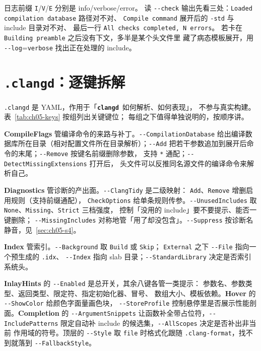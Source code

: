 \documentclass[12pt,a4paper,fontset=fandol]{ctexbook}
\newcommand{\Opt}[1]{\texttt{-\/-#1}}
\newcommand{\Bk}{\discretionary{}{}{}}
\newcommand{\Lib}[1]{\textbf{\texttt{#1}}}
\newcommand{\CD}{\Lib{clangd}}
\begin{document}
日志前缀 \texttt{I}/{\Bk}\texttt{V}/{\Bk}\texttt{E} 分别是 info/verbose/error。
读 \Opt{check} 输出先看三处：\texttt{Loaded compilation database} 路径对不对、
\texttt{Compile command} 展开后的 \texttt{-std} 与 include 目录对不对、
最后一行 \texttt{All checks completed, N errors}。
若卡在 \texttt{Building preamble} 之后没有下文，多半是某个头文件里
藏了病态模板展开，用 \Opt{log}=\texttt{verbose} 找出正在处理的 include。

\section{\texttt{.clangd}：逐键拆解}\label{sec:ch05-s2}

\texttt{.clangd} 是 YAML，作用于「\CD\ 如何解析、如何表现」，
不参与真实构建。表~\ref{tab:ch05-keys} 按组列出关键键位；
每组之下值得单独说明的，按顺序讲。

\textbf{CompileFlags} 管编译命令的来路与补丁。\Opt{CompilationDatabase}
给出编译数据库所在目录（相对配置文件所在目录解析）；\Opt{Add}
把若干参数追加到展开后命令的末尾；\Opt{Remove} 按键名前缀删除参数，
支持 \texttt{*} 通配；\Opt{DetectMissingExtensions} 打开后，
头文件可以反推同名源文件的编译命令来解析自己。

\textbf{Diagnostics} 管诊断的产出面。\Opt{ClangTidy} 是二级映射：
\texttt{Add}、\texttt{Remove} 增删启用规则（支持前缀通配），
\texttt{CheckOptions} 给单条规则传参。\Opt{UnusedIncludes}
取 \texttt{None}、\texttt{Missing}、\texttt{Strict} 三档强度，
控制「没用的 include」要不要提示、能否一键删除；
\Opt{MissingIncludes} 对称地管「用了却没包含」。\Opt{Suppress}
按诊断名静音，见~\ref{sec:ch05-s4}。

\textbf{Index} 管索引。\Opt{Background} 取 \texttt{Build} 或 \texttt{Skip}；
\texttt{External} 之下 \Opt{File} 指向一个预生成的 \texttt{.idx}、
\Opt{Index} 指向 slab 目录；\Opt{StandardLibrary} 决定是否索引系统头。

\textbf{InlayHints} 的 \Opt{Enabled} 是总开关，其余八键各管一类提示：
参数名、参数类型、返回类型、限定符、指定初始化器、冒号、
数组大小、模板依赖。\textbf{Hover} 的 \Opt{ShowColor} 给颜色字面量画色块，
\Opt{StoreProfile} 控制悬停里是否展示性能剖面。\textbf{Completion} 的
\Opt{ArgumentSnippets} 让函数补全带占位符，\Opt{IncludePatterns}
限定自动补 include 的候选集，\Opt{AllScopes} 决定是否补出非当前
作用域的符号。顶层的 \Opt{Style} 取 \texttt{file} 时格式化跟随
\texttt{.clang-format}，找不到就落到 \Opt{FallbackStyle}。
\end{document}
